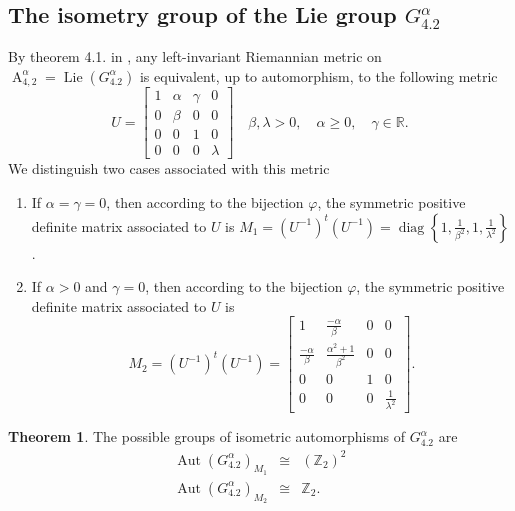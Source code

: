 \documentclass[12pt,a4paper,twoside]{article}
\theoremstyle{definition}
\newtheorem{theorem}{Theorem}[section]
\begin{document}
\subsection{The isometry group of the Lie group $G_{4.2}^{\alpha}$}
By theorem 4.1. in \cite{aitbenhaddou2025classification}, any left-invariant Riemannian metric on $\operatorname{A}_{4, 2}^{\alpha} = \operatorname{Lie}(G_{4.2}^{\alpha})$ is equivalent, up to automorphism, to the following metric
$$U = \begin{bmatrix}
1 & \alpha & \gamma & 0\\
0 & \beta & 0 & 0\\
0 & 0 & 1 & 0\\
0 & 0 & 0 & \lambda
\end{bmatrix} \quad \beta, \lambda > 0, \quad \alpha \geq 0, \quad \gamma \in \mathbb{R}.$$
We distinguish two cases associated with this metric
\begin{enumerate}
\item If $\alpha = \gamma = 0$, then according to the bijection $\varphi$, the symmetric positive definite matrix associated to $U$ is $M_1 = (U^{-1})^t(U^{-1}) = \operatorname{diag}\left\lbrace 1, \frac{1}{\beta^2}, 1, \frac{1}{\lambda^2}\right\rbrace$.
\item If $\alpha > 0$ and $\gamma = 0$, then according to the bijection $\varphi$, the symmetric positive definite matrix associated to $U$ is
$$M_2 = (U^{-1})^t(U^{-1}) = \begin{bmatrix}
1 & \frac{-\alpha}{\beta} & 0 & 0\\
\frac{-\alpha}{\beta} & \frac{\alpha^2 + 1}{\beta^2} & 0 & 0\\
0 & 0 & 1 & 0\\
0 & 0 & 0 & \frac{1}{\lambda^2}
\end{bmatrix}.$$
\end{enumerate}
\begin{theorem} \label{similar}
The possible groups of isometric automorphisms of $G_{4.2}^{\alpha}$ are
\begin{eqnarray*}
\operatorname{Aut}\left(G_{4.2}^{\alpha}\right)_{M_1}  &\cong& \left(\mathbb{Z}_2\right)^2\\
\operatorname{Aut}\left(G_{4.2}^{\alpha}\right)_{M_2}  &\cong& \mathbb{Z}_2.
\end{eqnarray*}
\end{theorem}
\end{document}
